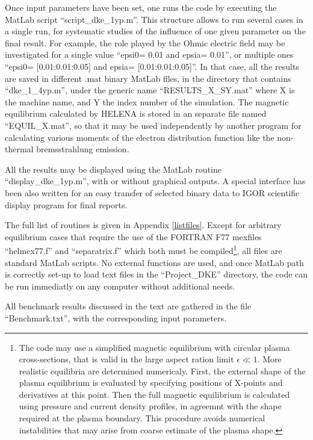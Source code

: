 Once input parameters have been set, one runs the code by executing the
MatLab script ``script\_dke\_1yp.m''. This structure allows to run several
cases in a single run, for systematic studies of the influence of one given
parameter on the final result. For example, the role played by the Ohmic
electric field may be investigated for a single value ``epsi0= 0.01 and
epsia= 0.01'', or multiple ones ``epsi0= [0.01:0.01:0.05] and epsia=
[0.01:0.01:0.05]''. In that case, all the results are saved in different
.mat binary MatLab files, in the directory that contains ``dke\_1\_4yp.m'',
under the generic name ``RESULTS\_X\_SY.mat'' where X is the machine name,
and Y the index number of the simulation. The magnetic equilibrium
calculated by HELENA is stored in an separate file named ``EQUIL\_X.mat'',
so that it may be used independently by another program for calculating
various moments of the electron distribution function like the non-thermal
bremsstrahlung emission.

All the results may be displayed using the MatLab routine
``display\_dke\_1yp.m'', with or without graphical outputs. A special
interface has been also written for an easy transfer of selected binary data
to IGOR scientific display program for final reports.

The full list of routines is given in Appendix \ref{listfiles}. Except for
arbitrary equilibrium cases that require the use of the FORTRAN F77 mexfiles
``helmex77.f'' and ``separatrix.f'' which both must be compiled\footnote{%
The code may use a simplified magnetic equilibrium with circular plasma
cross-sections, that is valid in the large aspect ration limit $\epsilon \ll
1.$ More realistic equilibria are determined numericaly. First, the external
shape of the plasma equilibrium is evaluated by specifying positions of
X-points and derivatives at this point. Then the full magnetic equilibrium
is calculated using pressure and current density profiles, in agreemnt with
the shape required at the plasma boundary. This procedure avoids numerical
instabilities that may arise from coarse estimate of the plasma shape.}, all
files are standard MatLab scripts. No external functions are used, and once
MatLab path is correctly set-up to load text files in the ``Project\_DKE''
directory, the code can be run immediatly on any computer without additional
needs.

All benchmark results discussed in the text are gathered in the file
``Benchmark.txt'', with the corresponding input parameters.
